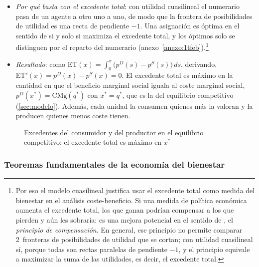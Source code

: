 \documentclass[11pt]{article}
\begin{document}
\begin{itemize}
\begin{itemize}
  \item {} (ET): su suma, la ganancia neta de producir y consumir el bien:
    \begin{equation}
    \mathrm{EC}=\int_0^{x^*}p^D(x)\,dx-p^*x^*,\qquad \mathrm{EP}=p^*q^*-\int_0^{q^*}p^S(q)\,dq,\qquad \mathrm{ET}=\mathrm{EC}+\mathrm{EP}. \label{eq:excedentes}
    \end{equation}
  \end{itemize}
\item \emph{Por qué basta con el excedente total}: con utilidad cuasilineal el numerario pasa de un agente a otro uno a uno, de modo que la frontera de posibilidades de utilidad es una recta de pendiente $-1$. Una asignación es óptima en el sentido de  si y solo si maximiza el excedente total, y los óptimos solo se distinguen por el reparto del numerario\nocite{MasColellWhinstonGreen1995} (anexo~\ref{anexo:1tfeb}).\footnote{Por eso el modelo cuasilineal justifica usar el excedente total como medida del bienestar en el análisis coste-beneficio. Si una medida de política económica aumenta el excedente total, los que ganan podrían compensar a los que pierden y aún les sobraría: es una mejora potencial en el sentido de , el \emph{principio de compensación}. En general, ese principio no permite comparar 2~fronteras de posibilidades de utilidad que se cortan; con utilidad cuasilineal sí, porque todas son rectas paralelas de pendiente $-1$, y el principio equivale a maximizar la suma de las utilidades, es decir, el excedente total.}
\item \emph{Resultado}: como $\mathrm{ET}(x)=\int_0^{x}\big(p^D(s)-p^S(s)\big)\,ds$, derivando, $\mathrm{ET}'(x)=p^D(x)-p^S(x)=0$. El excedente total es máximo en la cantidad en que el beneficio marginal social iguala al coste marginal social, $p^D(x^*)=\mathrm{CMg}(q^*)$ con $x^*=q^*$, que es la del equilibrio competitivo (\ref{sec:modelo}). Además, cada unidad la consumen quienes más la valoran y la producen quienes menos coste tienen.
\end{itemize}

\begin{figure}[H]
\centering
\caption{Excedentes del consumidor y del productor en el equilibrio competitivo: el excedente total es máximo en $x^*$}\label{fig:excedentes}
\end{figure}

\subsubsection{Teoremas fundamentales de la economía del bienestar}\label{sec:teoremas-fundamentales-economia}
\end{document}
